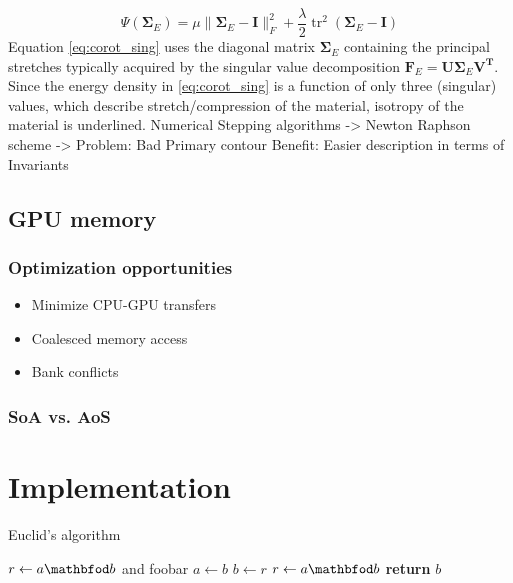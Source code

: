 \documentclass[m,times]{cgMA}
\begin{document}
\begin{equation} \label{eq:corot_sing}
  \Psi(\boldsymbol{\Sigma}_E) = \mu \| \boldsymbol { \Sigma }_E - \mathbf { I } \| _ { F } ^ { 2 } + \frac { \lambda } { 2 } \operatorname { tr } ^ { 2 } ( \boldsymbol { \Sigma }_E - \mathbf { I } )
\end{equation}
Equation \ref{eq:corot_sing} uses the diagonal matrix $\mathbf{\Sigma}_E$ containing the principal stretches typically acquired by the singular value decomposition $\mathbf{F}_E \mathbf{= U \Sigma}_E\mathbf{ V ^T }.$ Since the energy density in \ref{eq:corot_sing} is a function of only three (singular) values, which describe stretch/compression of the material, isotropy of the material is underlined.
\cite{ADAMS:ELASTICITY}
Numerical Stepping algorithms
-> Newton Raphson scheme
-> Problem: Bad Primary contour
Benefit: Easier description in terms of Invariants
\cite{MPM:INVERT}

\subsection{GPU memory}
\subsubsection{Optimization opportunities}
\cite{NVIDIA:BEST:PRACTICE}
\cite{AMD:GPU_OPEN}
\begin{itemize}
  \item Minimize CPU-GPU transfers
  \item Coalesced memory access
  \item Bank conflicts
\end{itemize}
\subsubsection{SoA vs. AoS}
\section{Implementation}
\newcommand{\var}[1]{{\ttfamily#1}}%
\begin{algorithm}[t]
  \caption{Euclid’s algorithm}\label{euclid}
  \begin{algorithmic}[1]
    \State $r\gets a\mathbfod b$ and \var{foobar}\label{foobar}
    \State $a\gets b$
    \State $b\gets r$
    \State $r\gets a\mathbfod b$
    \EndWhile\label{euclidendwhile}
    \State \textbf{return} $b$
    \EndProcedure
  \end{algorithmic}
\end{algorithm}
\end{document}
